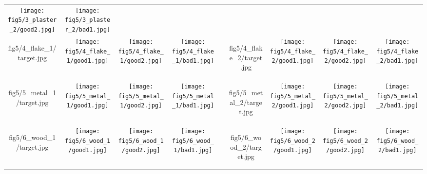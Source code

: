 \begin{figure*}[t]
\begin{tabular}{ccccccccc}
		\texttt{[image: fig5/3\_plaster\_2/good2.jpg]} &
		\texttt{[image: fig5/3\_plaster\_2/bad1.jpg]}
		\\
		\begin{overpic}[width=\resultwidth]{fig5/4_flake_1/target.jpg}
			\imglabel{Metallicflake-1}
		\end{overpic} &
		\texttt{[image: fig5/4\_flake\_1/good1.jpg]} &
		\texttt{[image: fig5/4\_flake\_1/good2.jpg]} &
		\texttt{[image: fig5/4\_flake\_1/bad1.jpg]} &
		&
		\begin{overpic}[width=\resultwidth]{fig5/4_flake_2/target.jpg}
			\imglabel{Metallicflake-2}
		\end{overpic} &
		\texttt{[image: fig5/4\_flake\_2/good1.jpg]} &
		\texttt{[image: fig5/4\_flake\_2/good2.jpg]} &
		\texttt{[image: fig5/4\_flake\_2/bad1.jpg]}
		\\
		\begin{overpic}[width=\resultwidth]{fig5/5_metal_1/target.jpg}
			\imglabel{Brushmetal-1}
		\end{overpic} &
		\texttt{[image: fig5/5\_metal\_1/good1.jpg]} &
		\texttt{[image: fig5/5\_metal\_1/good2.jpg]} &
		\texttt{[image: fig5/5\_metal\_1/bad1.jpg]} &
		&
		\begin{overpic}[width=\resultwidth]{fig5/5_metal_2/target.jpg}
			\imglabel{Brushmetal-2}
		\end{overpic} &
		\texttt{[image: fig5/5\_metal\_2/good1.jpg]} &
		\texttt{[image: fig5/5\_metal\_2/good2.jpg]} &
		\texttt{[image: fig5/5\_metal\_2/bad1.jpg]}
		\\
		\begin{overpic}[width=\resultwidth]{fig5/6_wood_1/target.jpg}
			\imglabel{Wood-1}
		\end{overpic} &
		\texttt{[image: fig5/6\_wood\_1/good1.jpg]} &
		\texttt{[image: fig5/6\_wood\_1/good2.jpg]} &
		\texttt{[image: fig5/6\_wood\_1/bad1.jpg]} & &
		\begin{overpic}[width=\resultwidth]{fig5/6_wood_2/target.jpg}
			\imglabel{Wood-2}
		\end{overpic} &
		\texttt{[image: fig5/6\_wood\_2/good1.jpg]} &
		\texttt{[image: fig5/6\_wood\_2/good2.jpg]} &
		\texttt{[image: fig5/6\_wood\_2/bad1.jpg]}
	\end{tabular}
	\captionsetup{labelfont=bf,textfont=it}
	\caption{\label{fig:synth}
		\textbf{Results} of our MCMC sampling on \textbf{synthetic} inputs. Each row corresponds to two examples of a different material model. For each example, the first column is the synthetic target image. We show MCMC samples in the other columns, where sample-1 and sample-2 are chosen closer to the peak of the posterior distribution, and sample-3 is further away. More results please refer to supplemental materials.
	}
\end{figure*}
